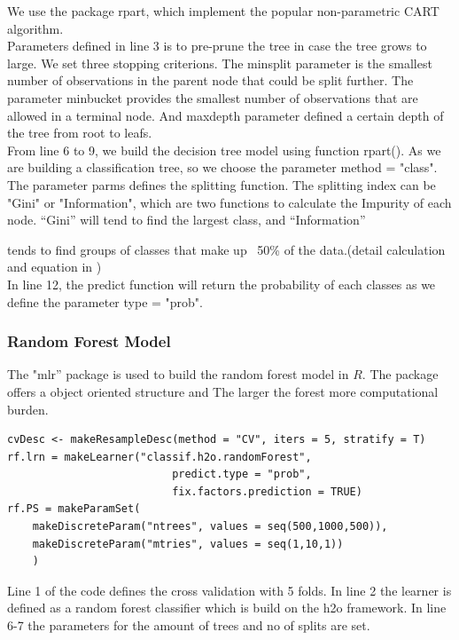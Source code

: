      \noindent We use the package rpart, which implement the popular non-parametric CART algorithm. \\
     [\baselineskip]\noindent Parameters defined in line 3 is to pre-prune the tree in case the tree grows to large. We set three stopping criterions. The minsplit parameter is the smallest number of observations in the parent node that could be split further. The parameter minbucket provides the smallest number of observations that are allowed in a terminal node. And maxdepth parameter defined a certain depth of the tree from root to leafs. \\
     [\baselineskip]\noindent From line 6 to 9, we build the decision tree model using function rpart(). As we are building a classification tree, so we choose the parameter method = "class". The parameter parms defines the splitting function. The splitting index can be "Gini" or "Information", which are two functions to calculate the Impurity of each node. “Gini” will tend to find the largest class, and “Information” \begin{flushleft}
     
     \end{flushleft}tends to find groups of classes that make up ~50\% of the data.(detail calculation and equation in \citep{terry})\\
     [\baselineskip]\noindent In line 12, the predict function will return the probability of each classes as we define the parameter type = "prob".
     \subsubsection{Random Forest Model}
     The "mlr'' package is used to build the random forest model in $R$. The package offers a object oriented structure and 
The larger the forest more computational burden. 
\begin{lstlisting}
cvDesc <- makeResampleDesc(method = "CV", iters = 5, stratify = T)
rf.lrn = makeLearner("classif.h2o.randomForest",
                          predict.type = "prob",
                          fix.factors.prediction = TRUE)
rf.PS = makeParamSet(
    makeDiscreteParam("ntrees", values = seq(500,1000,500)),
    makeDiscreteParam("mtries", values = seq(1,10,1))
    )
\end{lstlisting}
Line 1 of the code defines the cross validation with 5 folds. In line 2 the learner is defined as a random forest classifier which is build on the h2o framework.
In line 6-7 the parameters for the amount of trees and no of splits are set. 

